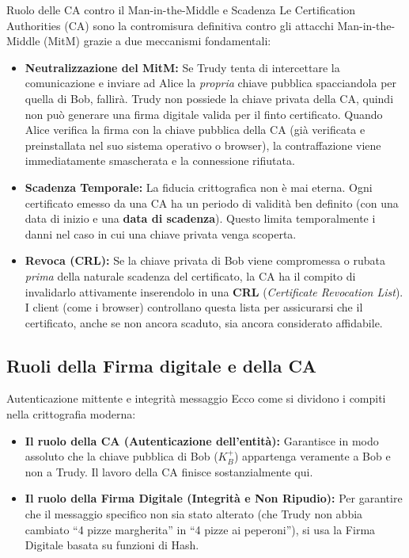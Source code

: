 \documentclass[a4paper,12pt]{report}
\begin{document}
\begin{notebox}{Ruolo delle CA contro il Man-in-the-Middle e Scadenza}
Le Certification Authorities (CA) sono la contromisura definitiva contro gli attacchi Man-in-the-Middle (MitM) grazie a due meccanismi fondamentali:

\begin{itemize}
    \item \textbf{Neutralizzazione del MitM:} Se Trudy tenta di intercettare la comunicazione e inviare ad Alice la \textit{propria} chiave pubblica spacciandola per quella di Bob, fallirà. Trudy non possiede la chiave privata della CA, quindi non può generare una firma digitale valida per il finto certificato. Quando Alice verifica la firma con la chiave pubblica della CA (già verificata e preinstallata nel suo sistema operativo o browser), la contraffazione viene immediatamente smascherata e la connessione rifiutata.
    
    \item \textbf{Scadenza Temporale:} La fiducia crittografica non è mai eterna. Ogni certificato emesso da una CA ha un periodo di validità ben definito (con una data di inizio e una \textbf{data di scadenza}). Questo limita temporalmente i danni nel caso in cui una chiave privata venga scoperta.
    
    \item \textbf{Revoca (CRL):} Se la chiave privata di Bob viene compromessa o rubata \textit{prima} della naturale scadenza del certificato, la CA ha il compito di invalidarlo attivamente inserendolo in una \textbf{CRL} (\textit{Certificate Revocation List}). I client (come i browser) controllano questa lista per assicurarsi che il certificato, anche se non ancora scaduto, sia ancora considerato affidabile.
\end{itemize}
\end{notebox}
\newpage


\subsection{Ruoli della Firma digitale e della CA}
\begin{urgentbox}{Autenticazione mittente e integrità messaggio}
    Ecco come si dividono i compiti nella crittografia moderna:

\begin{itemize}
    \item \textbf{Il ruolo della CA (Autenticazione dell'entità):} Garantisce in modo assoluto che la chiave pubblica di Bob ($K_B^+$) appartenga veramente a Bob e non a Trudy. Il lavoro della CA finisce sostanzialmente qui.
    
    \item \textbf{Il ruolo della Firma Digitale (Integrità e Non Ripudio):} Per garantire che il messaggio specifico non sia stato alterato (che Trudy non abbia cambiato ``4 pizze margherita'' in ``4 pizze ai peperoni''), si usa la Firma Digitale basata su funzioni di Hash.
\end{itemize}
\end{urgentbox}
\end{document}
